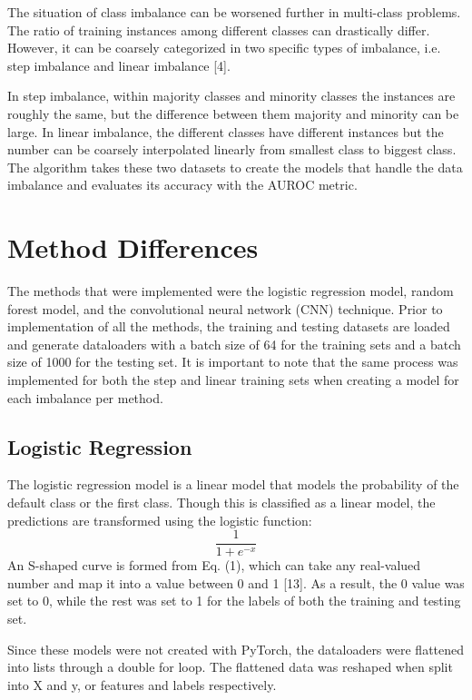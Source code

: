 \documentclass[conference]{IEEEtran}
\begin{document}
The situation of class imbalance can be worsened further in multi-class problems. The ratio of training instances among different classes can drastically differ. However, it can be coarsely categorized in two specific types of imbalance, i.e. step imbalance and linear imbalance [4].

In step imbalance, within majority classes and minority classes the instances are roughly the same, but the difference between them majority and minority can be large. In linear imbalance, the different classes have different instances but the number can be coarsely interpolated linearly from smallest class to biggest class. The algorithm takes these two datasets to create the models that handle the data imbalance and evaluates its accuracy with the AUROC metric. 

\section{Method Differences}
The methods that were implemented were the logistic regression model, random forest model, and the convolutional neural network (CNN) technique. Prior to implementation of all the methods, the training and testing datasets are loaded and generate dataloaders with a batch size of 64 for the training sets and a batch size of 1000 for the testing set. It is important to note that the same process was implemented for both the step and linear training sets when creating a model for each imbalance per method.

\subsection{Logistic Regression}
The logistic regression model is a linear model that models the probability of the default class or the first class. Though this is classified as a linear model, the predictions are transformed using the logistic function:  
\begin{equation}
\frac{1}{1 + e^{-x}}\label{eq}
\end{equation}
An S-shaped curve is formed from Eq. (1), which can take any real-valued number and map it into a value between 0 and 1 [13]. As a result, the 0 value was set to 0, while the rest was set to 1 for the labels of both the training and testing set. 

Since these models were not created with PyTorch, the dataloaders were flattened into lists through a double for loop. The flattened data was reshaped when split into X and y, or features and labels respectively. 
\end{document}
